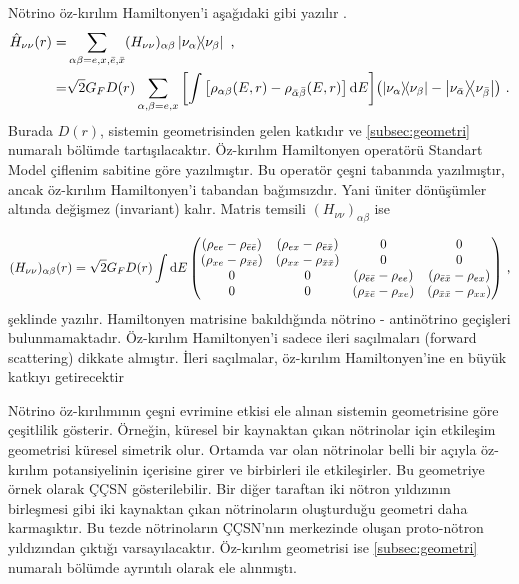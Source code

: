 Nötrino öz-kırılım Hamiltonyen'i aşağıdaki gibi yazılır \cite{Sigl:1993ctk}.
\begin{align}\label{eqn:Hamil_nunuOperator}
	\nonumber \hat{H}_{\nu\nu}(r)= & \sum_{\alpha\beta=e,x,\bar{e},\bar{x}} (H_{\nu\nu})_{\alpha\beta} \dyad{\nu_{\alpha}}{\nu_{\beta}} \text{ ,}\\ 
	=&\sqrt{2} G_{F} D(r)\sum_{\alpha,\beta = e,x} \qty[\int \qty[\rho_{\alpha\beta}(E,r)-\rho_{\bar{\alpha}\bar{\beta}}(E,r)]\dd{E}] \qty(\dyad{\nu_{\alpha}}{\nu_{\beta}}-\dyad{\nu_{\bar{\alpha}}}{\nu_{\bar{\beta}}}) \text{ .}
\end{align}
Burada $ D(r) $, sistemin geometrisinden gelen katkıdır ve \ref{subsec:geometri} numaralı bölümde tartışılacaktır. Öz-kırılım Hamiltonyen operatörü Standart Model çiflenim sabitine göre yazılmıştır. Bu operatör çeşni tabanında yazılmıştır, ancak öz-kırılım Hamiltonyen'i tabandan bağımsızdır. Yani üniter dönüşümler altında değişmez (invariant) kalır. Matris temsili $ (H_{\nu\nu})_{\alpha\beta} $ ise

{\small
\begin{equation}
	(H_{\nu\nu})_{\alpha\beta}(r) = \sqrt{2} G_{F} D(r) \int \dd{E} \mqty((\rho_{ee}-\rho_{\bar{e}\bar{e}}) & (\rho_{ex}-\rho_{\bar{e}\bar{x}}) & 0 & 0\\ (\rho_{xe}-\rho_{\bar{x}\bar{e}}) & (\rho_{xx}-\rho_{\bar{x}\bar{x}}) & 0 & 0\\ 0 & 0 & (\rho_{\bar{e}\bar{e}} -\rho_{ee}) & (\rho_{\bar{e}\bar{x}} -\rho_{ex}) \\ 0 & 0 & (\rho_{\bar{x}\bar{e}} -\rho_{xe}) & (\rho_{\bar{x}\bar{x}} -\rho_{xx})) \text{ ,}
\end{equation}}
şeklinde yazılır. Hamiltonyen matrisine bakıldığında nötrino - antinötrino geçişleri bulunmamaktadır. Öz-kırılım Hamiltonyen'i sadece ileri saçılmaları (forward scattering) dikkate almıştır. İleri saçılmalar, öz-kırılım Hamiltonyen'ine en büyük katkıyı getirecektir \cite{Cherry:2013mv, Volpe:2015rla}

Nötrino öz-kırılımının çeşni evrimine etkisi ele alınan sistemin geometrisine göre çeşitlilik gösterir. Örneğin, küresel bir kaynaktan çıkan nötrinolar için etkileşim geometrisi küresel simetrik olur. Ortamda var olan nötrinolar belli bir açıyla öz-kırılım potansiyelinin içerisine girer ve birbirleri ile etkileşirler. Bu geometriye örnek olarak ÇÇSN gösterilebilir. Bir diğer taraftan iki nötron yıldızının birleşmesi gibi iki kaynaktan çıkan nötrinoların oluşturduğu geometri daha karmaşıktır. Bu tezde nötrinoların ÇÇSN'nın merkezinde oluşan proto-nötron yıldızından çıktığı varsayılacaktır. Öz-kırılım geometrisi ise \ref{subsec:geometri} numaralı bölümde ayrıntılı olarak ele alınmıştı.

